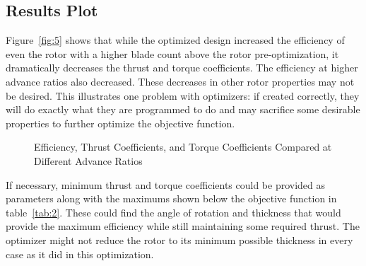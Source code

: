 \documentclass[journal ]{new-aiaa}
\begin{document}
\subsection{Results Plot}

Figure~\eqref{fig:5} shows that while the optimized design increased the efficiency of even the rotor with a higher blade count above the rotor pre-optimization, it dramatically decreases the thrust and torque coefficients. The efficiency at higher advance ratios also decreased. These decreases in other rotor properties may not be desired. This illustrates one problem with optimizers: if created correctly, they will do exactly what they are programmed to do and may sacrifice some desirable properties to further optimize the objective function.

\begin{figure}[H]
\centering

	\hspace{1em}
	\caption{Efficiency, Thrust Coefficients, and Torque Coefficients Compared at Different Advance Ratios}
	\captionsetup{aboveskip=0pt,font=it}
	\label{fig:5}
\end{figure}

If necessary, minimum thrust and torque coefficients could be provided as parameters along with the maximums shown below the objective function in table~\eqref{tab:2}. These could find the angle of rotation and thickness that would provide the maximum efficiency while still maintaining some required thrust. The optimizer might not reduce the rotor to its minimum possible thickness in every case as it did in this optimization.
\end{document}
